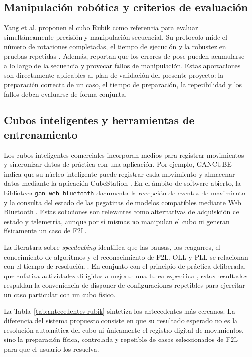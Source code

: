 \subsection{Manipulación robótica y criterios de evaluación}

Yang et al. proponen el cubo Rubik como referencia para evaluar simultáneamente precisión y manipulación secuencial. Su protocolo mide el número de rotaciones completadas, el tiempo de ejecución y la robustez en pruebas repetidas \cite{Yang2020}. Además, reportan que los errores de pose pueden acumularse a lo largo de la secuencia y provocar fallos de manipulación. Estas aportaciones son directamente aplicables al plan de validación del presente proyecto: la preparación correcta de un caso, el tiempo de preparación, la repetibilidad y los fallos deben evaluarse de forma conjunta.

\subsection{Cubos inteligentes y herramientas de entrenamiento}

Los cubos inteligentes comerciales incorporan medios para registrar movimientos y sincronizar datos de práctica con una aplicación. Por ejemplo, GANCUBE indica que su núcleo inteligente puede registrar cada movimiento y almacenar datos mediante la aplicación CubeStation \cite{GanCube2026}. En el ámbito de software abierto, la biblioteca \texttt{gan-web-bluetooth} documenta la recepción de eventos de movimiento y la consulta del estado de las pegatinas de modelos compatibles mediante Web Bluetooth \cite{GanWebBluetooth2026}. Estas soluciones son relevantes como alternativas de adquisición de estado y telemetría, aunque por sí mismas no manipulan el cubo ni generan físicamente un caso de F2L.

La literatura sobre \textit{speedcubing} identifica que las pausas, los reagarres, el conocimiento de algoritmos y el reconocimiento de F2L, OLL y PLL se relacionan con el tiempo de resolución \cite{Boyce2022}. En conjunto con el principio de práctica deliberada, que enfatiza actividades dirigidas a mejorar una tarea específica \cite{Ericsson1993}, estos resultados respaldan la conveniencia de disponer de configuraciones repetibles para ejercitar un caso particular con un cubo físico.

La Tabla~\ref{tab:antecedentes-rubik} sintetiza los antecedentes más cercanos. La diferencia del sistema propuesto consiste en que su resultado esperado no es la resolución automática del cubo ni únicamente el registro digital de movimientos, sino la preparación física, controlada y repetible de casos seleccionados de F2L para que el usuario los resuelva.

